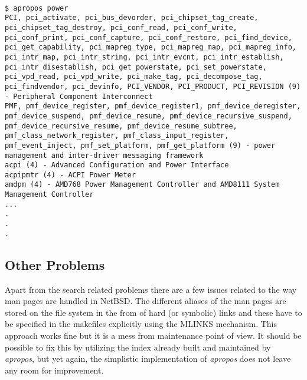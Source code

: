 \documentclass[letterpaper,twocolumn,10pt]{article}
\begin{document}
{\tt \small
{}
\begin{lstlisting}
$ apropos power
PCI, pci_activate, pci_bus_devorder, pci_chipset_tag_create,
pci_chipset_tag_destroy, pci_conf_read, pci_conf_write,
pci_conf_print, pci_conf_capture, pci_conf_restore, pci_find_device,
pci_get_capability, pci_mapreg_type, pci_mapreg_map, pci_mapreg_info,
pci_intr_map, pci_intr_string, pci_intr_evcnt, pci_intr_establish,
pci_intr_disestablish, pci_get_powerstate, pci_set_powerstate,
pci_vpd_read, pci_vpd_write, pci_make_tag, pci_decompose_tag,
pci_findvendor, pci_devinfo, PCI_VENDOR, PCI_PRODUCT, PCI_REVISION (9)
- Peripheral Component Interconnect
PMF, pmf_device_register, pmf_device_register1, pmf_device_deregister,
pmf_device_suspend, pmf_device_resume, pmf_device_recursive_suspend,
pmf_device_recursive_resume, pmf_device_resume_subtree,
pmf_class_network_register, pmf_class_input_register,
pmf_event_inject, pmf_set_platform, pmf_get_platform (9) - power
management and inter-driver messaging framework
acpi (4) - Advanced Configuration and Power Interface
acpipmtr (4) - ACPI Power Meter
amdpm (4) - AMD768 Power Management Controller and AMD8111 System
Management Controller
...
.
.
.
\end{lstlisting}
}

\subsection{Other Problems}
Apart from the search related problems there are a few issues related to
the way man pages are handled in NetBSD. The different aliases of the man pages
are stored on the file system in the from of hard (or symbolic) links and these
have to be specified in the makefiles explicitly using the MLINKS mechanism. This
approach works fine but it is a mess from maintenance point of view.
It should be possible to fix this by utilizing the index already built and
maintained by \textit{apropos}, but yet again, the simplistic implementation of
\textit{apropos} does not leave any room for improvement.
\end{document}

